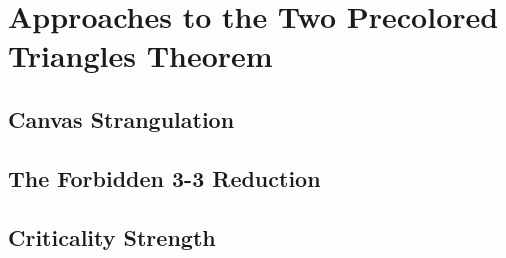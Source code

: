 \chapter{Approaches to the Two Precolored Triangles Theorem}

\section{Canvas Strangulation}

\section{The Forbidden 3-3 Reduction}

\section{Criticality Strength}
